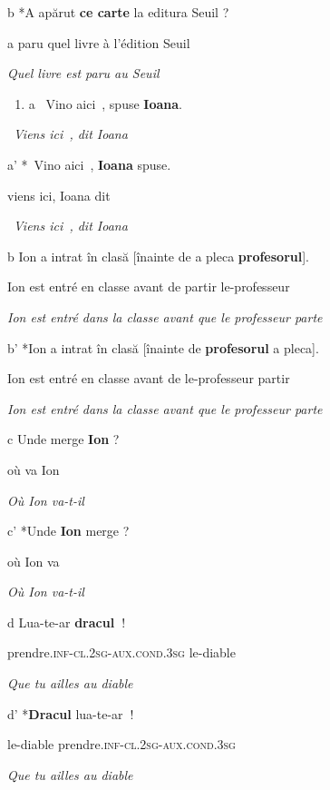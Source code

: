 b  *A apărut \textbf{ce carte} la editura Seuil ?

  a paru quel livre à l'édition Seuil

  \textit{Quel livre est paru au Seuil}


\begin{enumerate}
\item \label{bkm:Ref283931010}a  {\guillemotleft}~Vino aici~{\guillemotright}, spuse \textbf{Ioana}. 


\end{enumerate}
  {\guillemotleft}~\textit{Viens ici~{\guillemotright}, dit Ioana}

  a'  *{\guillemotleft}~Vino aici~{\guillemotright}, \textbf{Ioana} spuse.

    viens ici, Ioana dit 

  {\guillemotleft}~\textit{Viens ici~{\guillemotright}, dit Ioana}

b  Ion a intrat în clasă [înainte de a pleca \textbf{profesorul}].

Ion est entré en classe avant de partir le-professeur

  \textit{Ion est entré dans la classe avant que le professeur parte}

b'  *Ion a intrat în clasă [înainte de \textbf{profesorul} a pleca].

Ion est entré en classe avant de le-professeur partir

  \textit{Ion est entré dans la classe avant que le professeur parte}

c  Unde merge \textbf{Ion} ?

  où va Ion

  \textit{Où Ion va-t-il}

c'  *Unde \textbf{Ion} merge ?

  où Ion va

  \textit{Où Ion va-t-il}

d  Lua-te-ar \textbf{dracul~}!

  prendre.\textsc{inf}-\textsc{cl.2sg-aux.cond.3sg} le-diable  

  \textit{Que tu ailles au diable}

d'  *\textbf{Dracul} lua-te-ar\textbf{~}!

  le-diable prendre.\textsc{inf}-\textsc{cl.2sg-aux.cond.3sg}   

  \textit{Que tu ailles au diable}  

